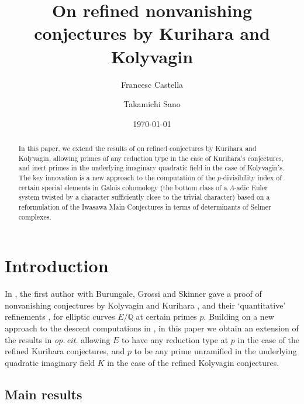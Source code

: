 \documentclass[10pt,reqno]{amsart}
\numberwithin{equation}{section}
\theoremstyle{plain}
\theoremstyle{definition}
\theoremstyle{definition}
\theoremstyle{plain}
\theoremstyle{plain}
\theoremstyle{plain}
\theoremstyle{plain}
\theoremstyle{plain}
\theoremstyle{plain}
\newcommand{\Q}{\mathbb{Q}}
\begin{document}
\title{On refined nonvanishing conjectures by Kurihara and Kolyvagin}

\author{Francesc Castella}
\address[F.~Castella]{University of California Santa Barbara, South Hall, Santa Barbara, CA 93106, USA}

\author{Takamichi Sano}
\address[T.~Sano]{Osaka Metropolitan University, Department of Mathematics, 3-3-138 Sugimoto, Sumiyoshi-ku, Osaka, 558-8585, Japan}


\begin{abstract}
In this paper, we extend the results of \cite{BCGS} on refined conjectures by Kurihara and Kolyvagin, allowing primes of any reduction type in the case of Kurihara's conjectures, and inert primes in the underlying imaginary quadratic field in the case of Kolyvagin's. The key innovation is a new approach to the computation of the $p$-divisibility index of certain special elements in Galois cohomology (the bottom class of a $\Lambda$-adic Euler system twisted by a character sufficiently close to the trivial character) 
based on a reformulation of the Iwasawa Main Conjectures in terms of determinants of Selmer complexes.
\end{abstract}

\date{\today}
\maketitle
\tableofcontents


\section{Introduction}

In \cite{BCGS}, the first author with Burungale, Grossi and Skinner gave a proof of nonvanishing conjectures by Kolyvagin \cite{kolystructure} and Kurihara \cite{kurihara-iwasawa2012}, and their `quantitative' refinements \cite{zhang-CDM,kim}, for elliptic curves $E/\Q$ at certain primes $p$. Building on a new approach to the descent computations in \cite{BCGS}, in this paper we obtain an extension of the results in \emph{op.\,cit.} allowing $E$ to have any reduction type at $p$
in the case of the refined Kurihara conjectures, and $p$ to be any prime unramified   
in the underlying quadratic imaginary field $K$ in the case of the refined Kolyvagin conjectures. 

\subsection{Main results}
\end{document}
